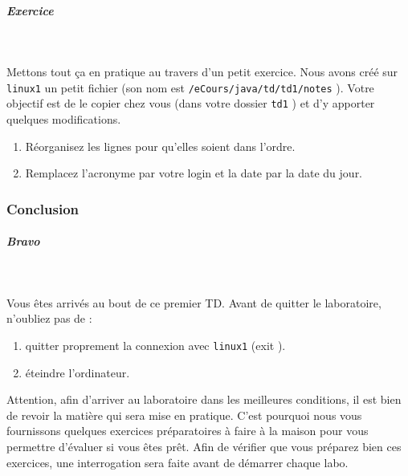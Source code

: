 \documentclass[11pt,a4paper]{article}
\begin{document}
			
		\subparagraph{Exercice} 
		
					\textcolor{white}{.} \par
				
            \par
        
Mettons tout \c ca en pratique au travers d'un petit exercice. Nous avons cr\'e\'e sur  \texttt{linux1}  un petit fichier (son nom est  \texttt{/eCours/java/td/td1/notes} ). Votre objectif est de le copier chez vous (dans votre dossier  \texttt{td1} ) et d'y apporter quelques modifications. 

					\begin{enumerate}
				
			\item R\'eorganisez les lignes pour qu'elles soient dans l'ordre.
			\item Remplacez l'acronyme par votre login et la date par la date du jour.
					\end{enumerate}
				
			
		\subsubsection{Conclusion} 
		\label{TD1TD1learningObject10.tex}
			
			
		\subparagraph{Bravo} 
		
					\textcolor{white}{.} \par
				
            \par
        
Vous \^etes arriv\'es au bout de ce premier TD. Avant de quitter le laboratoire, n'oubliez pas de :

					\begin{enumerate}
				
			\item quitter proprement la connexion avec  \texttt{linux1}  (exit ).
			\item \'eteindre l'ordinateur.
					\end{enumerate}
				
Attention, afin d'arriver au laboratoire dans les meilleures conditions, il est 
bien de revoir la mati\`ere qui sera mise en pratique. C'est pourquoi nous
vous fournissons quelques exercices pr\'eparatoires \`a faire \`a la maison 
pour vous permettre d'\'evaluer si vous \^etes pr\^et. Afin de v\'erifier que vous pr\'eparez bien ces exercices, une interrogation sera faite avant de d\'emarrer chaque labo.
\end{document}
